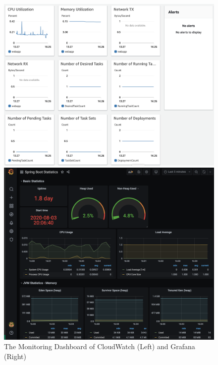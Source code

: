 \begin{figure}[!tbp]
     \centering
     \begin{minipage}[b]{0.47\textwidth}
       \includegraphics[width=\textwidth]{pics/monitoring.png}
     \end{minipage}
     \hfill
     \begin{minipage}[b]{0.50\textwidth}
       \includegraphics[width=\textwidth]{pics/grafana.png}
     \end{minipage}
     \label{fig:monitoring}
     \caption{The Monitoring Dashboard of CloudWatch (Left) and Grafana (Right)}
   \end{figure}
